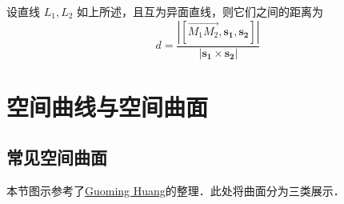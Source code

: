 \documentclass[12pt, a4paper, oneside, UTF8]{ctexbook}
\begin{document}
\begin{theorem}[两异面直线间的距离]
    设直线 $L_1, L_2$ 如上所述，且互为异面直线，则它们之间的距离为
    \[
        d = \frac{\left|[\overrightarrow{M_1M_2}, \boldsymbol{s_1}, \boldsymbol{s_2}]\right|}{|\boldsymbol{s_1} \times \boldsymbol{s_2}|}
    \]
\end{theorem}

\section{空间曲线与空间曲面}

\subsection{常见空间曲面}
\begin{myRemark}
    本节图示参考了\href{https://ming200110.github.io/2024/05/07/commonSpatialSurfacesAndTheirCorrespondingEquations/}{Guoming Huang}的整理．此处将曲面分为三类展示．
\end{myRemark}
\end{document}
